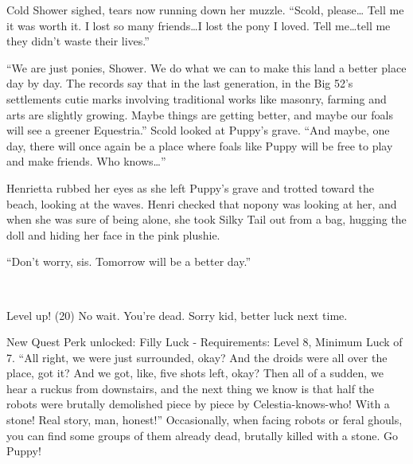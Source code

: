 Cold Shower sighed, tears now running down her muzzle. ``Scold, please\dots{} Tell me it was worth it. I lost so many friends\dots I lost the pony I loved. Tell me\dots tell me they didn't waste their lives.''

``We are just ponies, Shower. We do what we can to make this land a better place day by day. The records say that in the last generation, in the Big 52's settlements cutie marks involving traditional works like masonry, farming and arts are slightly growing. Maybe things are getting better, and maybe our foals will see a greener Equestria.'' Scold looked at Puppy's grave. ``And maybe, one day, there will once again be a place where foals like Puppy will be free to play and make friends. Who knows\dots''

Henrietta rubbed her eyes as she left Puppy's grave and trotted toward the beach, looking at the waves. Henri checked that nopony was looking at her, and when she was sure of being alone, she took Silky Tail out from a bag, hugging the doll and hiding her face in the pink plushie. 

``Don't worry, sis. Tomorrow will be a better day.''

~\vfill

\begin{engnote}
		Level up! (20) No wait. You're dead. Sorry kid, better luck next time.
	
		New Quest Perk unlocked: Filly Luck - Requirements: Level 8, Minimum Luck of 7. ``All right, we were just surrounded, okay? And the droids were all over the place, got it? And we got, like, five shots left, okay? Then all of a sudden, we hear a ruckus from downstairs, and the next thing we know is that half the robots were brutally demolished piece by piece by Celestia-knows-who! With a stone! Real story, man, honest!'' Occasionally, when facing robots or feral ghouls, you can find some groups of them already dead, brutally killed with a stone. Go Puppy!
\end{engnote}


